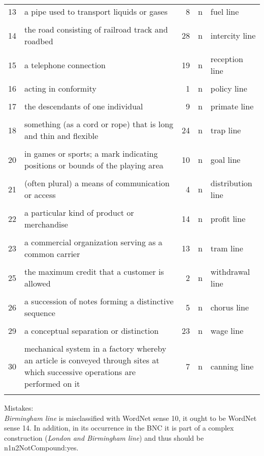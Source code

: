 \begin{longtable}{c>{\raggedright\arraybackslash}p{5cm}rc>{\raggedright\arraybackslash}p{2cm}}
13&a pipe used to transport liquids or gases&8&n&fuel line\\\\[-.7em]
14&the road consisting of railroad track and roadbed&28&n&intercity line\\\\[-.7em]
15&a telephone connection&19&n&reception line\\\\[-.7em]
16&acting in conformity&1&n&policy line\\\\[-.7em]
17&the descendants of one individual&9&n&primate line\\\\[-.7em]
18&something (as a cord or rope) that is long and thin and flexible&24&n&trap line\\\\[-.7em]
20&in games or sports; a mark indicating positions or bounds of the playing area&10&n&goal line\\\\[-.7em]
21&(often plural) a means of communication or access&4&n&distribution line\\\\[-.7em]
22&a particular kind of product or merchandise&14&n&profit line\\\\[-.7em]
23&a commercial organization serving as a common carrier&13&n&tram line\\\\[-.7em]
25&the maximum credit that a customer is allowed&2&n&withdrawal line\\\\[-.7em]
26&a succession of notes forming a distinctive sequence&5&n&chorus line\\\\[-.7em]
29&a conceptual separation or distinction&23&n&wage line\\\\[-.7em]
30&mechanical system in a factory whereby an article is conveyed through sites at which successive operations are performed on it&7&n&canning line\\\lspbottomrule
\end{longtable}

\noindent
Mistakes:\\
 \emph{Birmingham line} is misclassified with WordNet sense 10, it ought to be WordNet sense 14. In addition, in its occurrence in the BNC it is part of a complex construction (\emph{London and Birmingham line}) and thus should be n1n2NotCompound:yes.
